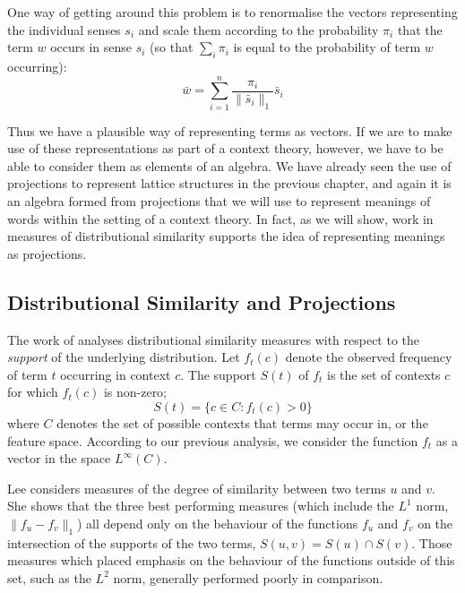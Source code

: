 One way of getting around this problem is to renormalise the vectors representing the individual senses $s_i$ and scale them according to the probability $\pi_i$ that the term $w$ occurs in sense $s_i$ (so that $\sum_i \pi_i$ is equal to the probability of term $w$ occurring):
$$\bar{w} = \sum_{i=1}^n \frac{\pi_i}{\|\bar{s}_i\|_1}\bar{s}_i$$


Thus we have a plausible way of representing terms as vectors. If we are to make use of these representations as part of a context theory, however, we have to be able to consider them as elements of an algebra. We have already seen the use of projections to represent lattice structures in the previous chapter, and again it is an algebra formed from projections that we will use to represent meanings of words within the setting of a context theory. In fact, as we will show, work in measures of distributional similarity supports the idea of representing meanings as projections.

\subsection{Distributional Similarity and Projections}
\label{dist-sim-projections-section}

The work of \cite{Lee:99} analyses distributional similarity measures with respect to the \emph{support} of the underlying distribution. Let $f_t(c)$ denote the observed frequency of term $t$ occurring in context $c$. The support $S(t)$ of $f_t$ is the set of contexts $c$ for which $f_t(c)$ is non-zero;
$$S(t) = \{c \in C : f_t(c) > 0\}$$
where $C$ denotes the set of possible contexts that terms may occur in, or the feature space. According to our previous analysis, we consider the function $f_t$ as a vector in the space $L^\infty(C)$.

Lee considers measures of the degree of similarity between two terms $u$ and $v$. She shows that the three best performing measures (which include the $L^1$ norm, $\|f_u - f_v\|_1$) all depend only on the behaviour of the functions $f_u$ and $f_v$ on the intersection of the supports of the two terms, $S(u,v) = S(u) \cap S(v)$. Those measures which placed emphasis on the behaviour of the functions outside of this set, such as the $L^2$ norm, generally performed poorly in comparison.

